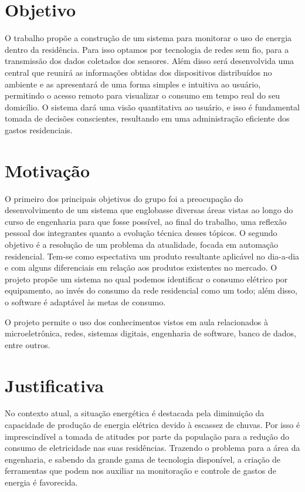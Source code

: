 \label{Cap:Introducao}

\section{Objetivo}
\label{Sec:objetivo}

O trabalho propõe a construção de um sistema para monitorar o uso de energia dentro da residência. Para isso optamos por tecnologia de redes sem fio, para a transmissão dos dados coletados dos sensores. Além disso será desenvolvida uma central que reunirá as informações obtidas dos dispositivos distribuídos no ambiente e as apresentará de uma forma simples e intuitiva ao usuário, permitindo o acesso remoto para visualizar o consumo em tempo real do seu domicílio. O sistema dará uma visão quantitativa ao usuário, e isso é fundamental tomada de decisões conscientes, resultando em uma administração eficiente dos gastos residenciais.

\section{Motivação}
\label{Sec:motivacao}

O primeiro dos principais objetivos do grupo foi a preocupação do desenvolvimento de um sistema que englobasse diversas áreas vistas ao longo do curso de engenharia para que fosse possível, ao final do trabalho, uma reflexão pessoal dos integrantes quanto a evolução técnica desses tópicos. O segundo objetivo é a resolução de um problema da atualidade, focada em automação residencial. Tem-se como espectativa um produto resultante aplicável no dia-a-dia e com alguns diferenciais em relação aos produtos existentes no mercado. O projeto propõe um sistema no qual podemos identificar o consumo elétrico por equipamento, ao invés do consumo da rede residencial como um todo; além disso, o software é adaptável às metas de consumo.

O projeto permite o uso dos conhecimentos vistos em aula relacionados à microeletrônica, redes, sistemas digitais, engenharia de software, banco de dados, entre outros.

\section{Justificativa}
\label{Sec:justificativa}

No contexto atual, a situação energética é destacada pela diminuição da capacidade de produção de energia elétrica devido à escassez de chuvas. Por isso é imprescindível a tomada de atitudes por parte da população para a redução do consumo de eletricidade nas suas residências. Trazendo o problema para a área da engenharia, e sabendo da grande gama de tecnologia disponível, a criação de ferramentas que podem nos auxiliar na monitoração e controle de gastos de energia é favorecida.

